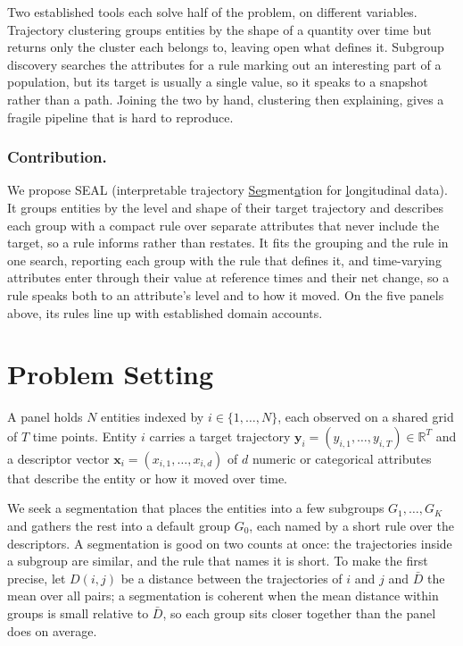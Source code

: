 \documentclass[runningheads]{llncs}
\begin{document}
Two established tools each solve half of the problem, on different variables. Trajectory clustering groups entities by the shape of a quantity over time but returns only the cluster each belongs to, leaving open what defines it. Subgroup discovery searches the attributes for a rule marking out an interesting part of a population, but its target is usually a single value, so it speaks to a snapshot rather than a path. Joining the two by hand, clustering then explaining, gives a fragile pipeline that is hard to reproduce.

\subsubsection{Contribution.}
We propose \textsc{SEAL} (interpretable trajectory \underline{Se}gment\underline{a}tion for \underline{l}ongitudinal data). It groups entities by the level and shape of their target trajectory and describes each group with a compact rule over separate attributes that never include the target, so a rule informs rather than restates. It fits the grouping and the rule in one search, reporting each group with the rule that defines it, and time-varying attributes enter through their value at reference times and their net change, so a rule speaks both to an attribute's level and to how it moved. On the five panels above, its rules line up with established domain accounts.

\section{Problem Setting}

A panel holds $N$ entities indexed by $i \in \{1, \dots, N\}$, each observed on a shared grid of $T$ time points. Entity $i$ carries a target trajectory $\mathbf{y}_i = (y_{i,1}, \dots, y_{i,T}) \in \mathbb{R}^T$ and a descriptor vector $\mathbf{x}_i = (x_{i,1}, \dots, x_{i,d})$ of $d$ numeric or categorical attributes that describe the entity or how it moved over time.

We seek a segmentation that places the entities into a few subgroups $G_1, \dots, G_K$ and gathers the rest into a default group $G_0$, each named by a short rule over the descriptors. A segmentation is good on two counts at once: the trajectories inside a subgroup are similar, and the rule that names it is short. To make the first precise, let $D(i,j)$ be a distance between the trajectories of $i$ and $j$ and $\bar{D}$ the mean over all pairs; a segmentation is coherent when the mean distance within groups is small relative to $\bar{D}$, so each group sits closer together than the panel does on average.
\end{document}
